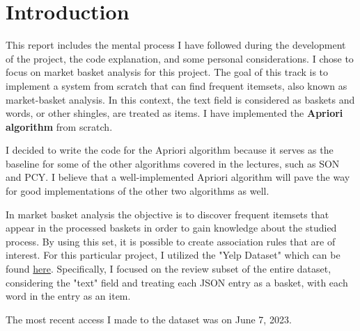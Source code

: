 \section{Introduction}
\label{introduction}

This report includes the mental process I have followed during the development of the project, the code explanation, and some personal considerations. I chose to focus on market basket analysis for this project. The goal of this track is to implement a system from scratch that can find frequent itemsets, also known as market-basket analysis. In this context, the text field is considered as baskets and words, or other shingles, are treated as items. I have implemented the \textbf{Apriori algorithm} from scratch.

I decided to write the code for the Apriori algorithm because it serves as the baseline for some of the other algorithms covered in the lectures, such as SON and PCY. I believe that a well-implemented Apriori algorithm will pave the way for good implementations of the other two algorithms as well.

In market basket analysis the objective is to discover frequent itemsets that appear in the processed baskets in order to gain knowledge about the studied process. By using this set, it is possible to create association rules that are of interest. For this particular project, I utilized the "Yelp Dataset" which can be found \href{https://www.kaggle.com/datasets/yelp-dataset/yelp-dataset}{here}. Specifically, I focused on the review subset of the entire dataset, considering the "text" field and treating each JSON entry as a basket, with each word in the entry as an item.

The most recent access I made to the dataset was on June 7, 2023.